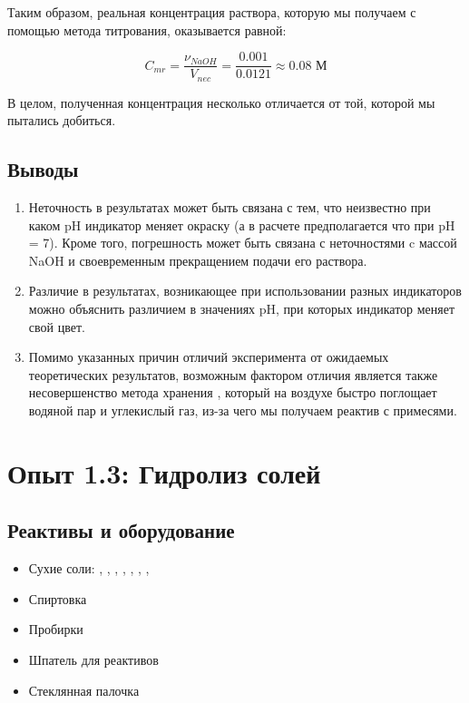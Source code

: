 \documentclass[a4paper, 12pt]{article}
\begin{document}
Таким образом, реальная концентрация раствора, которую мы получаем с помощью метода титрования, оказывается равной:

\begin{equation}
\boxed{
	C_{mr} = \frac{\nu_{NaOH}}{V_{nec}} = \frac{0.001}{0.0121} \approx 0.08 \text{ М}
}
\end{equation}

В целом, полученная концентрация несколько отличается от той, которой мы пытались добиться.

\bigskip

\subsection{Выводы}

\begin{enumerate}
	\item Неточность в результатах может быть связана с тем, что неизвестно при каком pH индикатор меняет окраску (а в расчете предполагается что при pH = 7). Кроме того, погрешность может быть связана с неточностями c массой NaOH и своевременным прекращением подачи его раствора.
	
	\item Различие в результатах, возникающее при использовании разных индикаторов можно объяснить различием в значениях pH, при которых индикатор меняет свой цвет.
	
	\item Помимо указанных причин отличий эксперимента от ожидаемых теоретических результатов, возможным фактором отличия является также несовершенство метода хранения , который на воздухе быстро поглощает водяной пар и углекислый газ, из-за чего мы получаем реактив с примесями.
\end{enumerate}

\section{Опыт 1.3: Гидролиз солей}

\subsection{Реактивы и оборудование}

\begin{itemize}
	\item Сухие соли: , , , , ,  , , 
	
	\item Спиртовка
	
	\item Пробирки
	
	\item Шпатель для реактивов
	
	\item Стеклянная палочка
\end{itemize}
\end{document}
